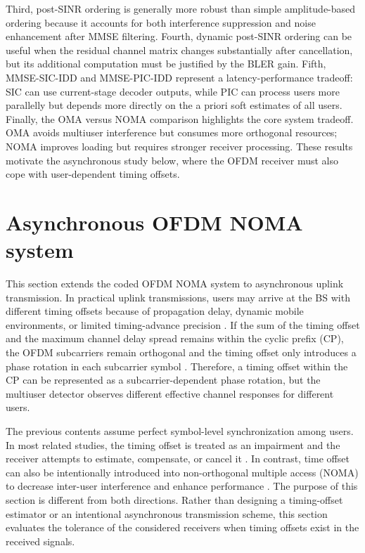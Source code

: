 Third, post-SINR ordering is generally more robust than simple amplitude-based ordering because it accounts for both interference suppression and noise enhancement after MMSE filtering. Fourth, dynamic post-SINR ordering can be useful when the residual channel matrix changes substantially after cancellation, but its additional computation must be justified by the BLER gain. Fifth, MMSE-SIC-IDD and MMSE-PIC-IDD represent a latency-performance tradeoff: SIC can use current-stage decoder outputs, while PIC can process users more parallelly but depends more directly on the a priori soft estimates of all users. Finally, the OMA versus NOMA comparison highlights the core system tradeoff. OMA avoids multiuser interference but consumes more orthogonal resources; NOMA improves loading but requires stronger receiver processing. These results motivate the asynchronous study below, where the OFDM receiver must also cope with user-dependent timing offsets.

\section{Asynchronous OFDM NOMA system}
\label{sec:asyn}

This section extends the coded OFDM NOMA system to asynchronous uplink transmission. In practical uplink transmissions, users may arrive at the BS with different timing offsets because of propagation delay, dynamic mobile environments, or limited timing-advance precision \cite{lin2023uplink,haci2017performance,abeywickrama2017over}. If the sum of the timing offset and the maximum channel delay spread remains within the cyclic prefix (CP), the OFDM subcarriers remain orthogonal and the timing offset only introduces a phase rotation in each subcarrier symbol \cite{minn2003robust}. Therefore, a timing offset within the CP can be represented as a subcarrier-dependent phase rotation, but the multiuser detector observes different effective channel responses for different users.

The previous contents assume perfect symbol-level synchronization among users. In most related studies, the timing offset is treated as an impairment and the receiver attempts to estimate, compensate, or cancel it \cite{lin2023uplink,haci2017performance,minn2003robust}. In contrast, time offset can also be intentionally introduced into non-orthogonal multiple access (NOMA) to decrease inter-user interference and enhance performance \cite{li2023transceiver}. The purpose of this section is different from both directions. Rather than designing a timing-offset estimator or an intentional asynchronous transmission scheme, this section evaluates the tolerance of the considered receivers when timing offsets exist in the received signals.

